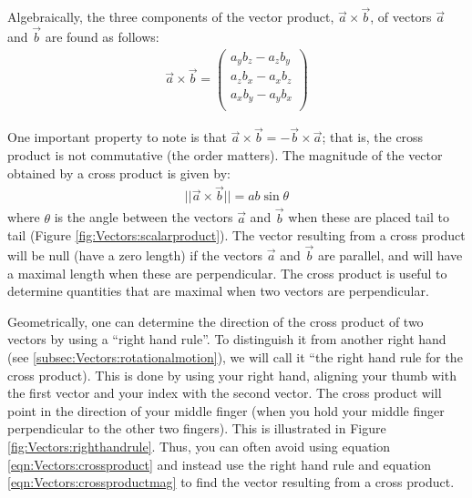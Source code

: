Algebraically, the three components of the vector product, $\vec a\times \vec b$, of vectors $\vec a$ and $\vec b$ are found as follows:
\begin{align}
\label{eqn:Vectors:crossproduct}
\vec a \times \vec b =\begin{pmatrix}
           a_yb_z - a_z b_y\\
           a_zb_x - a_x b_z\\
           a_xb_y - a_y b_x\\
         \end{pmatrix}
\end{align}

One important property to note is that $\vec a \times \vec b = -\vec b \times \vec a$; that is, the cross product is not commutative (the order matters). The magnitude of the vector obtained by a cross product is given by:
\begin{align}
\label{eqn:Vectors:crossproductmag}
||\vec a \times \vec b ||=ab\sin\theta
\end{align}
where $\theta$ is the angle between the vectors $\vec a$ and $\vec b$ when these are placed tail to tail (Figure \ref{fig:Vectors:scalarproduct}). The vector resulting from a cross product will be null (have a zero length) if the vectors $\vec a$ and $\vec b$ are parallel, and will have a maximal length when these are perpendicular. The cross product is useful to determine quantities that are maximal when two vectors are perpendicular. 

Geometrically, one can determine the direction of the cross product of two vectors by using a ``right hand rule''. To distinguish it from another right hand (see  \ref{subsec:Vectors:rotationalmotion}), we will call it ``the right hand rule for the cross product). This is done by using your right hand, aligning your thumb with the first vector and your index with the second vector. The cross product will point in the direction of your middle finger (when you hold your middle finger perpendicular to the other two fingers). This is illustrated in Figure \ref{fig:Vectors:righthandrule}. Thus, you can often avoid using equation \ref{eqn:Vectors:crossproduct} and instead use the right hand rule and equation \ref{eqn:Vectors:crossproductmag} to find the vector resulting from a cross product.


